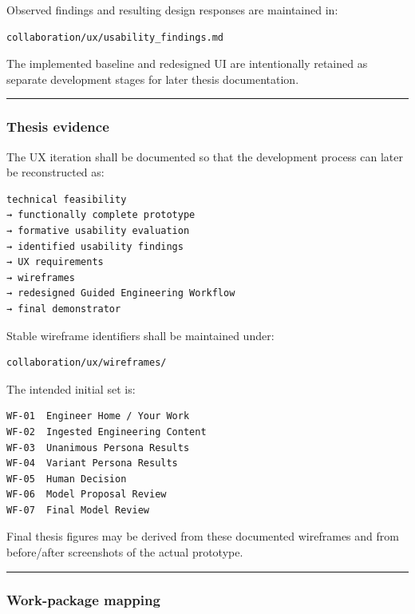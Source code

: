 Observed findings and resulting design responses are maintained in:

\begin{verbatim}
collaboration/ux/usability_findings.md
\end{verbatim}

The implemented baseline and redesigned UI are intentionally retained as separate development stages for later thesis documentation.

\begin{center}\rule{0.5\linewidth}{0.5pt}\end{center}

\hypertarget{thesis-evidence}{%
\subsubsection{Thesis evidence}\label{thesis-evidence}}

The UX iteration shall be documented so that the development process can later be reconstructed as:

\begin{verbatim}
technical feasibility
→ functionally complete prototype
→ formative usability evaluation
→ identified usability findings
→ UX requirements
→ wireframes
→ redesigned Guided Engineering Workflow
→ final demonstrator
\end{verbatim}

Stable wireframe identifiers shall be maintained under:

\begin{verbatim}
collaboration/ux/wireframes/
\end{verbatim}

The intended initial set is:

\begin{verbatim}
WF-01  Engineer Home / Your Work
WF-02  Ingested Engineering Content
WF-03  Unanimous Persona Results
WF-04  Variant Persona Results
WF-05  Human Decision
WF-06  Model Proposal Review
WF-07  Final Model Review
\end{verbatim}

Final thesis figures may be derived from these documented wireframes and from before/after screenshots of the actual prototype.

\begin{center}\rule{0.5\linewidth}{0.5pt}\end{center}

\hypertarget{work-package-mapping}{%
\subsubsection{Work-package mapping}\label{work-package-mapping}}

